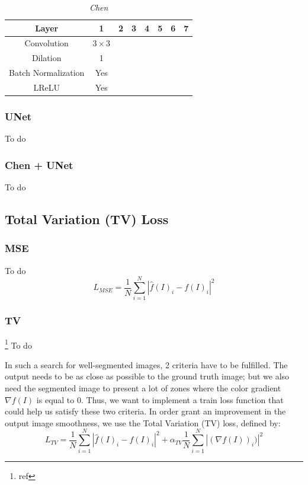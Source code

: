 \documentclass{article}
\begin{document}
            \begin{table}[!ht]
                \centering
                \begin{tabular}{|c|c|c|c|c|c|c|c|}
                    \hline
                    Layer & 1 & 2 & 3 & 4 & 5 & 6 & 7\\
                    \hline \hline
                    Convolution & $3\times3$ & & & & & & \\
                    \hline
                    Dilation & 1 & & & & & & \\
                    \hline
                    Batch Normalization & Yes & & & & & & \\
                    \hline
                    LReLU & Yes & & & & & & \\
                    \hline
                \end{tabular}
                \caption{\textit{Chen}}
            \end{table}

        \subsubsection{UNet}
        To do
        \subsubsection{Chen + UNet}
        To do

    \subsection{Total Variation (TV) Loss}
        \subsubsection{MSE}
        To do
        $$L_{MSE}=\frac{1}{N}\sum_{i=1}^N |\hat{f}(I)_i-f(I)_i|^2$$

        \subsubsection{TV}\footnote{ref}
        To do

        In such a search for well-segmented images, 2 criteria have to be fulfilled. The output needs to be as close as possible to the ground truth image; but we also need the segmented image to present a lot of zones where the color gradient $\nabla f(I)$ is equal to $0$. Thus, we want to implement a train loss function that could help us satisfy these two criteria.
        In order grant an improvement in the output image smoothness, we use the Total Variation (TV) loss, defined by:
        $$
        L_{TV}=\frac{1}{N}\sum_{i=1}^N |\hat{f}(I)_i-f(I)_i|^2+\alpha_{TV}\frac{1}{N}\sum_{i=1}^N|(\nabla f(I))_i)|^2
        $$
\end{document}
